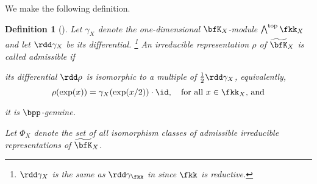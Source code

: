 \documentclass[12pt,a4paper]{amsart}
\numberwithin{equation}{section}
\newtheorem{defn}[thm]{Definition}
\theoremstyle{remark}
\def\wtbfK{\widetilde{\bfK}}
\def\half{{\tfrac{1}{2}}}
\def\rmtop{{\mathrm{top}}}
\def\bbfK{\wtbfK}
\begin{document}
  We make the following definition.

\begin{defn}[{\cite[Definition~7.13]{Vo89}}]\label{def:admD}
  Let $\gamma_X$ denote the one-dimensional $\bfK_X$-module
  $\bigwedge^{\rmtop} \fkk_X$ and let $\rdd\gamma_X$ be its
  differential. \footnote{$\rdd\gamma_X$ is the same as $\rdd\gamma_\fkk$ in
    \cite[Theorem~7.11]{Vo89} since $\fkk$ is reductive.}  An irreducible
  representation $\rho$ of $\bbfK_X$ is called \emph{admissible} if
  \begin{enumT}
  \item its differential $\rdd\rho$ is isomorphic to a multiple of
    $\half \rdd\gamma_X$, equivalently,
    \[
      \rho(\exp(x)) = \gamma_X(\exp(x/2))\cdot \id, \quad\textrm{for all }x\in
      \fkk_X\text{, and}
    \]
  \item it is $\bpp$-genuine.
  \end{enumT}

  Let $\Phi_X$ denote the set of all isomorphism classes of admissible
  irreducible representations of $\bbfK_X$.
\end{defn}
\end{document}
